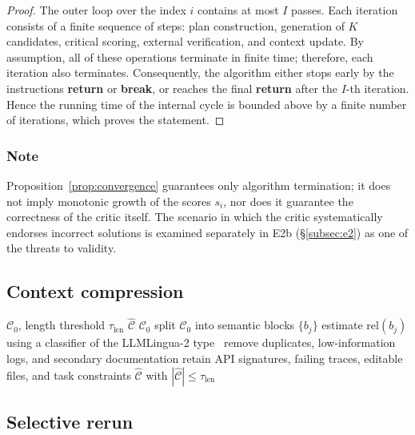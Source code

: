 \begin{proof}
The outer loop over the index $i$ contains at most $I$ passes. Each iteration consists of a finite sequence of steps: plan construction, generation of $K$ candidates, critical scoring, external verification, and context update. By assumption, all of these operations terminate in finite time; therefore, each iteration also terminates. Consequently, the algorithm either stops early by the instructions \textbf{return} or \textbf{break}, or reaches the final \textbf{return} after the $I$-th iteration. Hence the running time of the internal cycle is bounded above by a finite number of iterations, which proves the statement.
\end{proof}

\subsubsection*{Note}
Proposition~\ref{prop:convergence} guarantees only algorithm termination; it does not imply monotonic growth of the scores $s_i$, nor does it guarantee the correctness of the critic itself. The scenario in which the critic systematically endorses incorrect solutions is examined separately in E2b (§\ref{subsec:e2}) as one of the threats to validity.

\subsection{Context compression}

\begin{algorithm}[htbp]
\caption{Compression of long context}\label{alg:compression}
\begin{algorithmic}[1]
\Require $\mathcal{C}_0$, length threshold $\tau_{\text{len}}$
\Ensure $\hat{\mathcal{C}}$
 \Return $\mathcal{C}_0$ \EndIf
\State split $\mathcal{C}_0$ into semantic blocks $\{b_j\}$
\State estimate $\text{rel}(b_j)$ using a classifier of the LLMLingua-2 type~\cite{pan2024llmlingua2}
\State remove duplicates, low-information logs, and secondary documentation
\State retain API signatures, failing traces, editable files, and task constraints
\State \Return $\hat{\mathcal{C}}$ with $|\hat{\mathcal{C}}|\le\tau_{\text{len}}$
\end{algorithmic}
\end{algorithm}

\subsection{Selective rerun}

